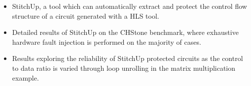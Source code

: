 \vspace{-10pt}
\begin{itemize}
	\setlength{\itemsep}{1pt}
	\setlength{\parskip}{0pt}
	\setlength{\parsep}{0pt}
	\item StitchUp, a tool which can automatically extract and protect the control flow structure of a circuit generated with a HLS tool.
	\item Detailed results of StitchUp on the CHStone benchmark, where exhaustive hardware fault injection is performed on the majority of cases.
	\item Results exploring the reliability of StitchUp protected circuits as the control to data ratio is varied through
	loop unrolling in the matrix multiplication example.
\end{itemize}
%
%
